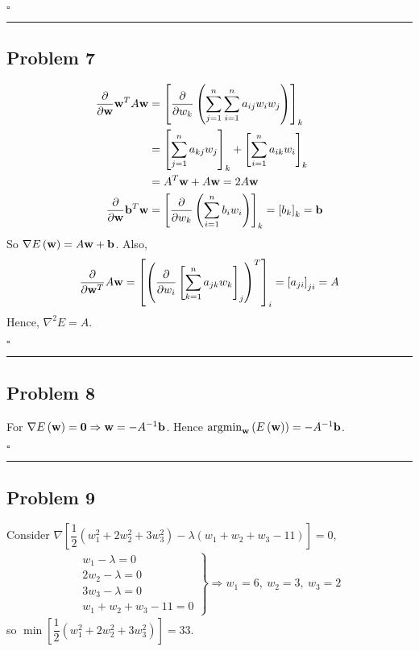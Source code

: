 \documentclass[12pt]{article}
\newcommand{\argmin}{\operatornamewithlimits{argmin}}
\newcommand*{\QEDB}{\hfill\ensuremath{\square}}
\newcommand{\SBrackets}[1]{\left[#1\right]}
\newcommand{\ParTh}[1]{\left(#1\right)}
\newcommand{\BF}[1]{{\bf#1}}
\newcommand{\Inverse}[1]{{#1}^{-1}}
\newcommand{\horrule}[1]{\rule{\linewidth}{#1}}
\begin{document}
\QEDB

\horrule{0.5pt}

\subsection*{Problem 7}

\begin{align}
\dfrac{\partial}{\partial \BF{w}}\BF{w}^TA\BF{w}&=\SBrackets{\dfrac{\partial}{\partial w_k}\ParTh{\sum_{j=1}^{n}\sum_{i=1}^{n}a_{ij}w_iw_j}}_k\\
&=\SBrackets{\sum_{j=1}^{n}a_{kj}w_j}_k+\SBrackets{\sum_{i=1}^{n}a_{ik}w_i}_k\\
&=A^T\BF{w}+A\BF{w}=2A\BF{w}\\
\dfrac{\partial}{\partial \BF{w}}\BF{b}^T\BF{w}&=\SBrackets{\dfrac{\partial}{\partial w_k}\ParTh{\sum_{i=1}^{n}b_iw_i}}_k=\SBrackets{b_k}_k=\BF{b}
\end{align}
So $\nabla E\ParTh{\BF{w}}=A\BF{w}+\BF{b}$. Also,
\begin{align}
\dfrac{\partial}{\partial \BF{w}^T}A\BF{w}=\SBrackets{\ParTh{\dfrac{\partial}{\partial w_i}\SBrackets{\sum_{k=1}^{n}a_{jk}w_k}_j}^T}_i=\SBrackets{a_{ji}}_{ji}=A
\end{align}
Hence, $\nabla^2 E = A$.

\QEDB

\horrule{0.5pt}

\subsection*{Problem 8}

For $\nabla E\ParTh{\BF{w}}=\BF{0}\Rightarrow\BF{w}=-\Inverse{A}\BF{b}$. Hence $\argmin_{\BF{w}}\ParTh{E\ParTh{\BF{w}}}=-A^{-1}\BF{b}$.

\QEDB

\horrule{0.5pt}

\subsection*{Problem 9}

Consider $\nabla\SBrackets{\dfrac{1}{2}\ParTh{w^2_1+2w^2_2+3w^2_3}-\lambda\ParTh{w_1+w_2+w_3-11}}=0$,
\begin{align}
\left.
\begin{array}{r}
w_1-\lambda=0\\
2w_2-\lambda=0\\
3w_3-\lambda=0\\
w_1+w_2+w_3-11=0
\end{array}
\right\}
\Rightarrow w_1=6,~w_2=3,~w_3=2
\end{align}
so $\min\SBrackets{\dfrac{1}{2}\ParTh{w^2_1+2w^2_2+3w^2_3}}=33$.
\end{document}
